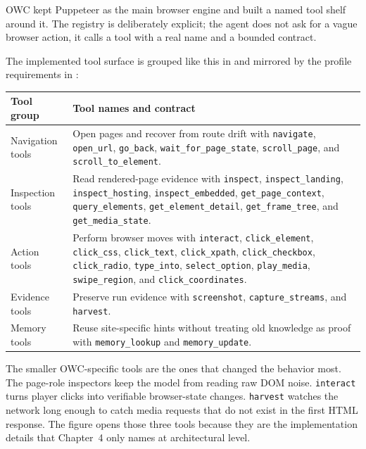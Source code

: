 OWC kept Puppeteer as the main browser engine and built a named tool shelf around it.
The registry is deliberately explicit; the agent does not ask for a vague browser action,
it calls a tool with a real name and a bounded contract.

The implemented tool surface is grouped like this in
 and mirrored by the profile requirements in
:
\begin{center}
\small
\begin{tabularx}{\textwidth}{Q{3.2cm}Y}
\toprule
{}
Tool group & Tool names and contract \\
\midrule
Navigation tools & Open pages and recover from route drift with \texttt{navigate},
\texttt{open\_url}, \texttt{go\_back}, \texttt{wait\_for\_page\_state},
\texttt{scroll\_page}, and \texttt{scroll\_to\_element}. \\
Inspection tools & Read rendered-page evidence with \texttt{inspect},
\texttt{inspect\_landing}, \texttt{inspect\_hosting}, \texttt{inspect\_embedded},
\texttt{get\_page\_context}, \texttt{query\_elements}, \texttt{get\_element\_detail},
\texttt{get\_frame\_tree}, and \texttt{get\_media\_state}. \\
Action tools & Perform browser moves with \texttt{interact}, \texttt{click\_element},
\texttt{click\_css}, \texttt{click\_text}, \texttt{click\_xpath},
\texttt{click\_checkbox}, \texttt{click\_radio}, \texttt{type\_into},
\texttt{select\_option}, \texttt{play\_media}, \texttt{swipe\_region}, and
\texttt{click\_coordinates}. \\
Evidence tools & Preserve run evidence with \texttt{screenshot},
\texttt{capture\_streams}, and \texttt{harvest}. \\
Memory tools & Reuse site-specific hints without treating old knowledge as proof with
\texttt{memory\_lookup} and \texttt{memory\_update}. \\
\bottomrule
\end{tabularx}
\end{center}

The smaller OWC-specific tools are the ones that changed the behavior most. The
page-role inspectors keep the model from reading raw DOM noise. \texttt{interact} turns
player clicks into verifiable browser-state changes. \texttt{harvest} watches the network
long enough to catch media requests that do not exist in the first HTML response. The
figure opens those three tools because they are the implementation details that Chapter~4
only names at architectural level.

